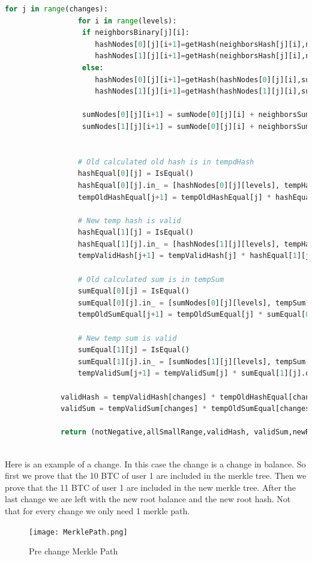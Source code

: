 \begin{lstlisting}[language=Python, caption=Liabilities change circuit pseudocode]
             for j in range(changes):
                 for i in range(levels):
                  if neighborsBinary[j][i]:
                     hashNodes[0][j][i+1]=getHash(neighborsHash[j][i],neighborsSum[j][i],hashNodes[0][j][i],sumNode[0][j][i])
                     hashNodes[1][j][i+1]=getHash(neighborsHash[j][i],neighborsSum[j][i],hashNodes[1][j][i],sumNode[1][j][i])
                  else:
                     hashNodes[0][j][i+1]=getHash(hashNodes[0][j][i],sumNode[0][j][i],neighborsHash[j][i],neighborsSum[j][i])
                     hashNodes[1][j][i+1]=getHash(hashNodes[1][j][i],sumNode[1][j][i],neighborsHash[j][i],neighborsSum[j][i])

                  sumNodes[0][j][i+1] = sumNode[0][j][i] + neighborsSum[j][i]
                  sumNodes[1][j][i+1] = sumNode[0][j][i] + neighborsSum[j][i]
                     
         
                 # Old calculated old hash is in tempdHash
                 hashEqual[0][j] = IsEqual()
                 hashEqual[0][j].in_ = [hashNodes[0][j][levels], tempHash[j]].out
                 tempOldHashEqual[j+1] = tempOldHashEqual[j] * hashEqual[0][j].out
         
                 # New temp hash is valid
                 hashEqual[1][j] = IsEqual()
                 hashEqual[1][j].in_ = [hashNodes[1][j][levels], tempHash[j+1]].out
                 tempValidHash[j+1] = tempValidHash[j] * hashEqual[1][j].out
         
                 # Old calculated sum is in tempSum
                 sumEqual[0][j] = IsEqual()
                 sumEqual[0][j].in_ = [sumNodes[0][j][levels], tempSum[j]].out
                 tempOldSumEqual[j+1] = tempOldSumEqual[j] * sumEqual[0][j].out
                 
                 # New temp sum is valid
                 sumEqual[1][j] = IsEqual()
                 sumEqual[1][j].in_ = [sumNodes[1][j][levels], tempSum[j+1]].out
                 tempValidSum[j+1] = tempValidSum[j] * sumEqual[1][j].out
         
             validHash = tempValidHash[changes] * tempOldHashEqual[changes]
             validSum = tempValidSum[changes] * tempOldSumEqual[changes]
         
             return (notNegative,allSmallRange,validHash, validSum,newRootHash,newSum)
         
      \end{lstlisting}

      Here is an example of a change. In this case the change is a change in balance. So first we prove that the 10 BTC of user 1 are 
      included in the merkle tree. Then we prove that the 11 BTC of user 1 are included in the new merkle tree. After the last change we are left
      with the new root balance and the new root hash. Not that for every change we only need 1 merkle path.
      \begin{figure}[H]
         \centering
         \texttt{[image: MerklePath.png]}
         \caption{Pre change Merkle Path}
         \label{overflow}
         \end{figure}

